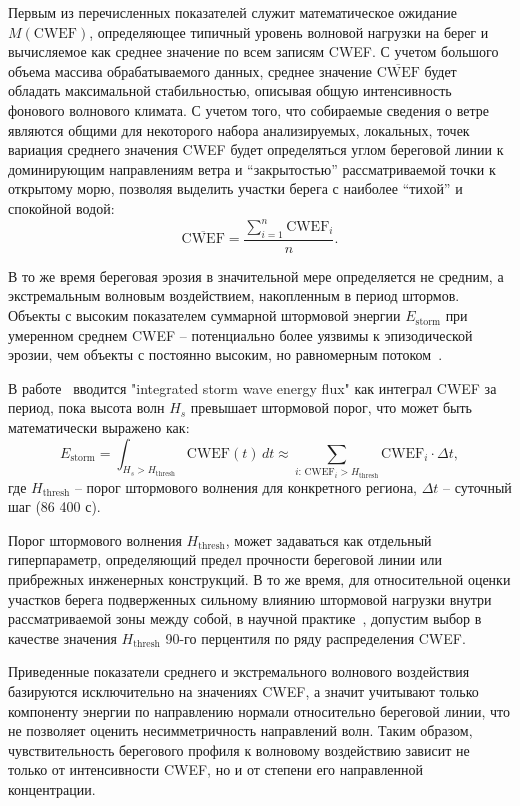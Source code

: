 Первым из перечисленных показателей служит математическое ожидание $M(\text{CWEF})$, определяющее типичный уровень волновой нагрузки на берег и вычисляемое как среднее значение по всем записям CWEF.
С учетом большого объема массива обрабатываемого  данных, среднее значение  $\overline{\text{CWEF}}$ будет обладать максимальной стабильностью, описывая общую интенсивность фонового волнового климата.
С учетом того, что собираемые сведения о ветре являются общими для некоторого набора анализируемых, локальных, точек вариация среднего значения CWEF будет определяться углом береговой линии к доминирующим направлениям ветра и \enquote{закрытостью} рассматриваемой точки к открытому морю, позволяя выделить участки берега с наиболее \enquote{тихой} и спокойной водой:
\begin{equation}\label{eq:M_CWEF}
    \overline{\text{CWEF}} = \frac{\sum_{i=1}^n{\text{CWEF}_i}}{n}.
\end{equation}

В то же время береговая эрозия в значительной мере определяется не средним, а экстремальным волновым воздействием, накопленным в период штормов. 
Объекты с высоким показателем суммарной штормовой энергии $E_\text{storm}$ при умеренном среднем CWEF -- потенциально более уязвимы к эпизодической эрозии, чем объекты с постоянно высоким, но равномерным потоком~\cite{Harley2017}.

В работе~\cite{Harley2017} вводится "integrated storm wave energy flux" как интеграл CWEF за период, пока высота волн $H_s$ превышает штормовой порог, что может быть математически выражено как:
\begin{equation}
    E_\text{storm} = \int_{H_s > H_\text{thresh}} \text{CWEF}(t)\,dt \approx \sum_{i:\,\text{CWEF}_i > H_\text{thresh}} \text{CWEF}_i \cdot \Delta t,
\end{equation}
где $H_\text{thresh}$ -- порог штормового волнения для конкретного региона, $\Delta t$ -- суточный шаг (86 400 с).

Порог штормового волнения $H_\text{thresh}$, может задаваться как отдельный гиперпараметр, определяющий предел прочности береговой линии или прибрежных инженерных конструкций.
В то же время, для относительной оценки участков берега подверженных сильному влиянию штормовой нагрузки внутри рассматриваемой зоны между собой, в научной практике~\cite{Harley2017}, допустим выбор в качестве значения $H_\text{thresh}$ 90-го перцентиля по ряду распределения CWEF.

Приведенные показатели среднего и экстремального волнового воздействия базируются исключительно на значениях CWEF, а значит учитывают только компоненту энергии по направлению нормали относительно береговой линии, что не позволяет оценить несимметричность направлений волн.
Таким образом, чувствительность берегового профиля к волновому воздействию зависит не только от интенсивности CWEF, но и от степени его направленной концентрации. 

